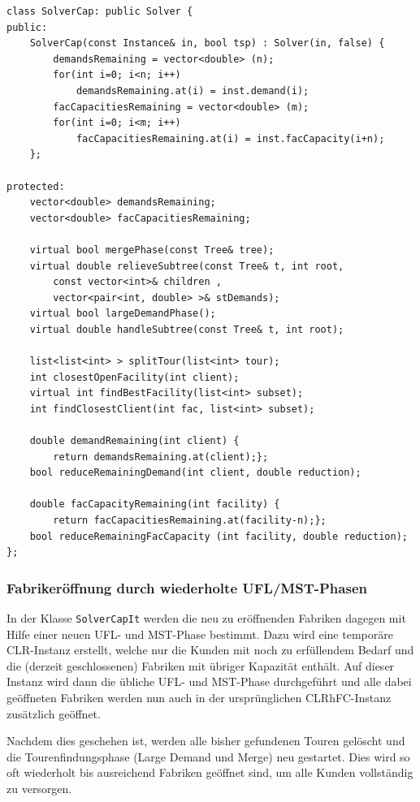 \documentclass[a4paper,ngerman,11pt,bibtotoc]{scrartcl}
\theoremstyle{definition}
\theoremstyle{plain}
\theoremstyle{remark}
\newcommand{\CLR}{CLR}
\newcommand{\CLRHFC}{CLRhFC}
\newcommand{\MST}{MST}
\newcommand{\UFL}{UFL}
\begin{document}
\begin{lstlisting}[caption=Die Klasse SolverCap]
class SolverCap: public Solver {
public:
	SolverCap(const Instance& in, bool tsp) : Solver(in, false) {
		demandsRemaining = vector<double> (n);
		for(int i=0; i<n; i++) 
			demandsRemaining.at(i) = inst.demand(i);
		facCapacitiesRemaining = vector<double> (m);
		for(int i=0; i<m; i++) 
			facCapacitiesRemaining.at(i) = inst.facCapacity(i+n);
	};

protected:
	vector<double> demandsRemaining;
	vector<double> facCapacitiesRemaining;

	virtual bool mergePhase(const Tree& tree);
	virtual double relieveSubtree(const Tree& t, int root, 
		const vector<int>& children , 
		vector<pair<int, double> >& stDemands);
	virtual bool largeDemandPhase();
	virtual double handleSubtree(const Tree& t, int root);

	list<list<int> > splitTour(list<int> tour);
	int closestOpenFacility(int client);
	virtual int findBestFacility(list<int> subset);
	int findClosestClient(int fac, list<int> subset);

	double demandRemaining(int client) {
		return demandsRemaining.at(client);};
	bool reduceRemainingDemand(int client, double reduction);

	double facCapacityRemaining(int facility) {
		return facCapacitiesRemaining.at(facility-n);};
	bool reduceRemainingFacCapacity (int facility, double reduction);
};
\end{lstlisting}
	
	\subsubsection{Fabrikeröffnung durch wiederholte \UFL/\MST-Phasen}
	
	In der Klasse \lstinline|SolverCapIt| werden die neu zu eröffnenden Fabriken dagegen mit Hilfe einer neuen \UFL- und \MST-Phase bestimmt. Dazu wird eine temporäre \CLR-Instanz erstellt, welche nur die Kunden mit noch zu erfüllendem Bedarf und die (derzeit geschlossenen) Fabriken mit übriger Kapazität enthält. Auf dieser Instanz wird dann die übliche \UFL- und \MST-Phase durchgeführt und alle dabei geöffneten Fabriken werden nun auch in der ursprünglichen \CLRHFC-Instanz zusätzlich geöffnet. 
	
	Nachdem dies geschehen ist, werden alle bisher gefundenen Touren gelöscht und die Tourenfindungsphase (Large Demand und Merge) neu gestartet. Dies wird so oft wiederholt bis ausreichend Fabriken geöffnet sind, um alle Kunden vollständig zu versorgen.
	
\end{document}
